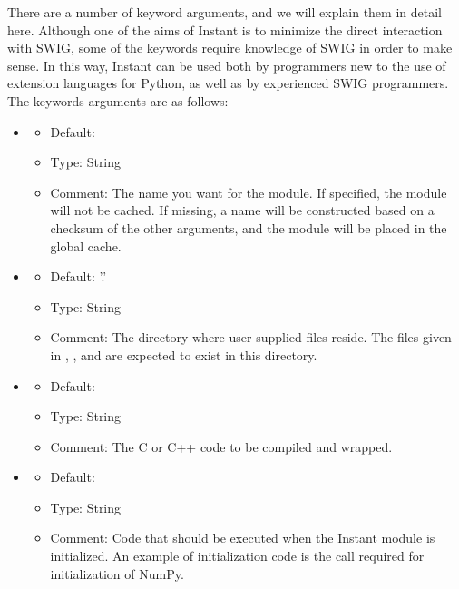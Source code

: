 There are a number of keyword arguments, and we will explain them in detail
here. Although one of the aims of Instant is to minimize the direct
interaction with SWIG, some of the keywords require knowledge of SWIG
in order to make sense. In this way, Instant can be used both by programmers
new to the use of extension languages for Python, as well as by experienced
SWIG programmers. The keywords arguments are as follows:
\begin{itemize}
\item {}
  \begin{itemize}
  \item Default: 
  \item Type: String
  \item Comment: The name you want for the module.
    If specified, the module will not be cached.
    If missing, a name will be constructed based on
    a checksum of the other arguments, and the module
    will be placed in the global cache. 
  \end{itemize}
\item {}
  \begin{itemize}
    \item Default: '.'
    \item Type: String
    \item Comment: The directory where user supplied files reside. The files
      given in , , and 
      are expected to exist in this directory.
  \end{itemize}
\item {}
  \begin{itemize}
    \item Default: 
    \item Type: String
    \item Comment: The C or C++ code to be compiled and wrapped.
  \end{itemize}
\item {}
  \begin{itemize}
    \item Default: 
    \item Type: String
    \item Comment: Code that should be executed when the Instant module is
      initialized. An
      example of initialization code is the call  required for  
      initialization of NumPy.
  \end{itemize}

\end{itemize}
